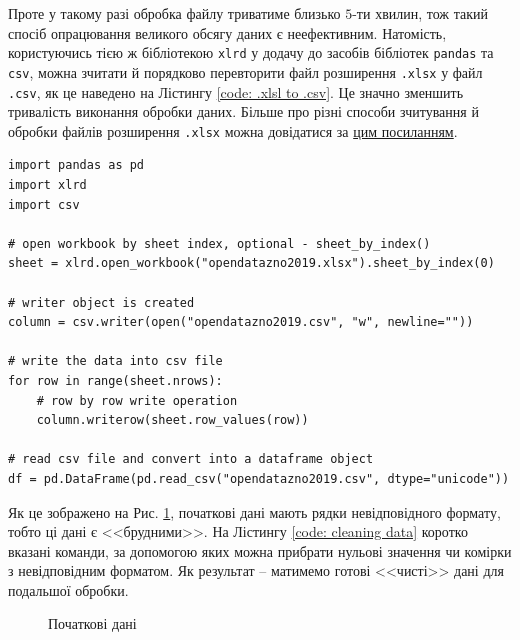 \vspace{0.4cm}
Проте у такому разі обробка файлу триватиме близько $5$-ти хвилин, тож такий спосіб опрацювання великого 
обсягу даних є неефективним. Натомість, користуючись тією ж бібліотекою \texttt{xlrd} у додачу до засобів 
бібліотек \texttt{pandas} та \texttt{csv}, можна зчитати й порядково перевторити файл розширення \texttt{.xlsx} 
у файл \texttt{.csv}, як це наведено на Лістингу \ref{code: .xlsl to .csv}. Це значно зменшить тривалість 
виконання обробки даних. Більше про різні способи зчитування й обробки файлів розширення \texttt{.xlsx} можна 
довідатися за \href{https://linuxhint.com/read-excel-file-python/}{цим посиланням}.

\newpage
\begin{lstlisting}[firstnumber=16, label = code: .xlsl to .csv, caption = Конвертація у \texttt{.csv} файл]
import pandas as pd
import xlrd 
import csv
    
# open workbook by sheet index, optional - sheet_by_index()
sheet = xlrd.open_workbook("opendatazno2019.xlsx").sheet_by_index(0)
    
# writer object is created
column = csv.writer(open("opendatazno2019.csv", "w", newline=""))
    
# write the data into csv file
for row in range(sheet.nrows):
    # row by row write operation
    column.writerow(sheet.row_values(row))
    
# read csv file and convert into a dataframe object
df = pd.DataFrame(pd.read_csv("opendatazno2019.csv", dtype="unicode"))
\end{lstlisting}

\vspace{0.4cm}
Як це зображено на Рис. \ref{figure: initial data}, початкові дані мають рядки невідповідного формату, 
тобто ці дані є <<брудними>>. На Лістингу \ref{code: cleaning data} коротко вказані команди, за допомогою 
яких можна прибрати нульові значення чи комірки з невідповідним форматом. Як результат -- матимемо готові 
<<чисті>> дані для подальшої обробки. 

\begin{figure}[H]
    \caption{Початкові дані}
    \label{figure: initial data}
\end{figure}

